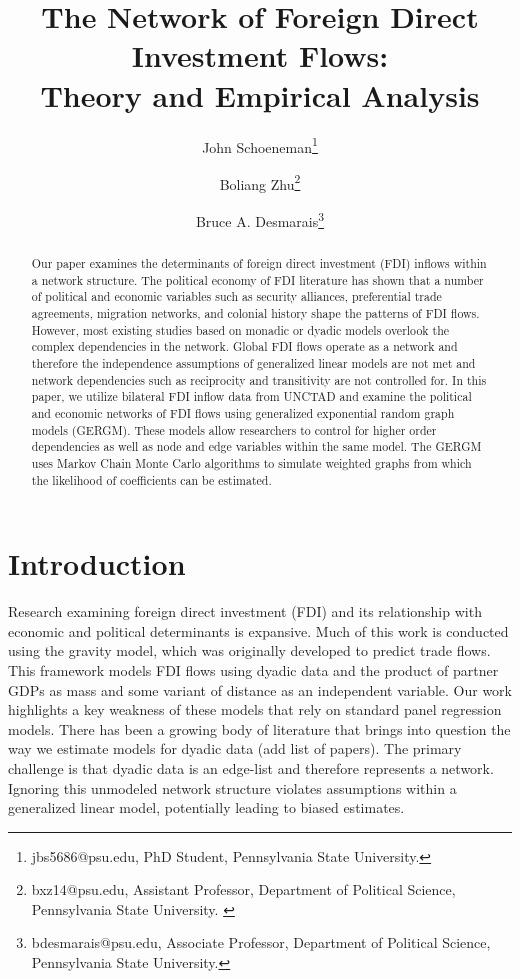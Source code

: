\documentclass{article}
\begin{document}
\title{The Network of Foreign Direct Investment Flows: \\Theory and Empirical Analysis}
\author{John  Schoeneman\thanks{\footnotesize{
jbs5686@psu.edu, PhD Student, Pennsylvania State University.}} \and Boliang Zhu\thanks{\footnotesize{bxz14@psu.edu, Assistant Professor, Department of Political Science, Pennsylvania State University. }} \and Bruce A. Desmarais\thanks{\footnotesize{
bdesmarais@psu.edu, Associate Professor, Department of Political Science, Pennsylvania State University.}}}
\date{}
\maketitle

\singlespacing
\begin{abstract} 
    \noindent Our paper examines the determinants of foreign direct investment (FDI) inflows within a network structure. The political economy of FDI literature has shown that a number of political and economic variables such as security alliances, preferential trade agreements, migration networks, and colonial history shape the patterns of FDI flows. However, most existing studies based on monadic or dyadic models overlook the complex dependencies in the network. Global FDI flows operate as a network and therefore the independence assumptions of generalized linear models are not met and network dependencies such as reciprocity and transitivity are not controlled for. In this paper, we utilize bilateral FDI inflow data from UNCTAD and examine the political and economic networks of FDI flows using generalized exponential random graph models (GERGM). These models allow researchers to control for higher order dependencies as well as node and edge variables within the same model. The GERGM uses Markov Chain Monte Carlo algorithms to simulate weighted graphs from which the likelihood of coefficients can be estimated.

\end{abstract}

\section{Introduction}

Research examining foreign direct investment (FDI) and its relationship with economic and political determinants is expansive. Much of this work is conducted using the gravity model, which was originally developed to predict trade flows. This framework models FDI flows using dyadic data and the product of partner GDPs as mass and some variant of distance as an independent variable. Our work highlights a key weakness of these models that rely on standard panel regression models. There has been a growing body of literature that brings into question the way we estimate models for dyadic data (add list of papers). The primary challenge is that dyadic data is an edge-list and therefore represents a network. Ignoring this unmodeled network structure violates assumptions within a generalized linear model, potentially leading to biased estimates.
\newpage
\end{document}
